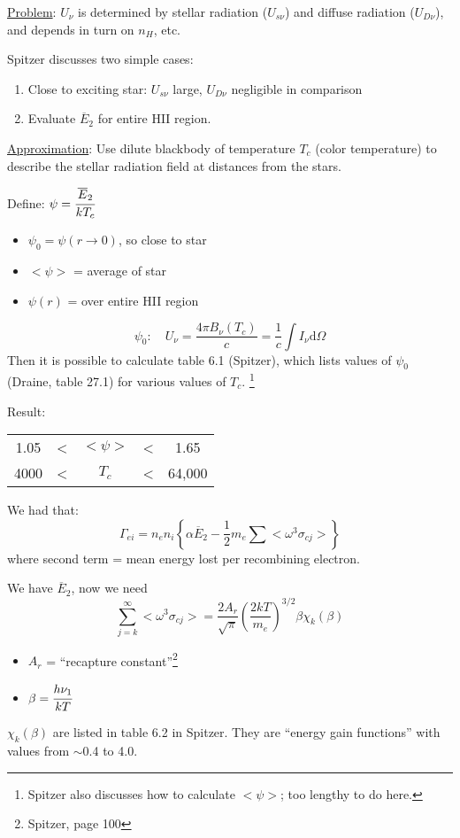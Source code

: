 \documentclass[12pt]{article}
\newcommand{\mar}[1]{\hspace{0pt}\marginpar{-\textcolor{black}{#1}-}}
\begin{document}
\underline{Problem}:
$U_{\nu}$ is determined by stellar radiation ($U_{s\nu}$) and
diffuse radiation ($U_{D\nu}$), and depends in turn on $n_{H}$, etc.

Spitzer discusses two simple cases:
\begin{enumerate}
    \item Close to exciting star: $U_{s\nu}$ large, $U_{D\nu}$ negligible
        in comparison
    \item Evaluate $\overline{E}_{2}$ for entire HII region.
\end{enumerate}

\underline{Approximation}:
Use dilute blackbody of temperature $T_{c}$ (color temperature)
to describe the stellar radiation field at distances from the stars.

Define: $\psi = \cfrac{\overline{E}_{2}}{kT_{c}}$
\begin{itemize}[label={}]
    \item $\psi_{0} = \psi(r\rightarrow 0)$, so close to star
    \item $<\psi>$ = average of star
    \item $\psi(r)$ = over entire HII region
\end{itemize}

\mar{155}
\[
    \psi_{0}:\quad U_{\nu} = \frac{4 \pi B_{\nu} (T_{c})}{c}
    = \frac{1}{c}\int{I_{\nu}\mathrm{d}\Omega}
    \]
Then it is possible to calculate table 6.1 (Spitzer), which lists values of
$\psi_{0}$ (Draine, table 27.1) for various values of $T_{c}$. \footnote{
    Spitzer also discusses how to calculate $<\psi>$; too lengthy to do here.
}

Result:
\begin{tabular}{c c c c c}
    1.05 & \textless & $<\psi>$ & \textless & 1.65\\
    4000 & \textless & $T_{c}$ & \textless & 64,000\\
\end{tabular}

We had that:
\[
    \Gamma_{ei} = n_{e}n_{i}\left\{\alpha\overline{E}_{2}
    - \frac{1}{2}m_{e}\sum{<\omega^{3}\sigma_{cj}>}\right\}
    \]
where second term = mean energy lost per recombining electron.

We have $\overline{E}_{2}$, now we need
\[
    \sum_{j=k}^{\infty}{<\omega^{3}\sigma_{cj}>}
    = \frac{2A_{r}}{\sqrt{\pi}} \left(\frac{2kT}{m_{e}}\right)^{3/2}
    \beta\chi_{k}(\beta)
    \]
\begin{itemize}[label={}]
    \item $A_{r}$ = ``recapture constant''\footnote{Spitzer, page 100}
    \item $\beta = \cfrac{h\nu_{1}}{kT}$
\end{itemize}
$\chi_{k}(\beta)$ are listed in table 6.2 in Spitzer.
They are ``energy gain functions'' with values from $\sim$0.4 to 4.0.
\end{document}
